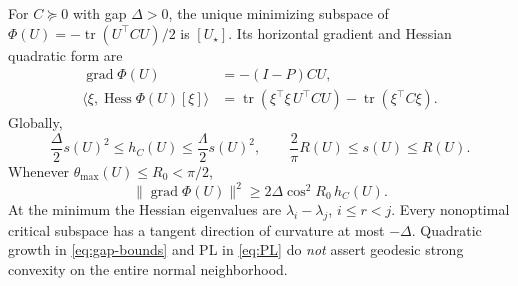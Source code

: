 \begin{theorem}
\label{thm:landscape}
For $C\succeq0$ with gap $\Delta>0$, the unique minimizing subspace of
$\Phi(U)=-\operatorname{tr}(U^\top CU)/2$ is $[U_\star]$.
Its horizontal gradient and Hessian quadratic form are
\begin{align}
 \operatorname{grad}\Phi(U)&=-(I-P)CU,\label{eq:grass-grad}\\
 \langle\xi,\operatorname{Hess}\Phi(U)[\xi]\rangle
 &=\operatorname{tr}(\xi^\top\xi\,U^\top CU)
   -\operatorname{tr}(\xi^\top C\xi).\label{eq:grass-hess}
\end{align}
Globally,
\begin{equation}
 \frac\Delta2s(U)^2\le h_C(U)\le\frac\Lambda2s(U)^2,
 \qquad \frac2\pi R(U)\le s(U)\le R(U).\label{eq:gap-bounds}
\end{equation}
Whenever $\theta_{\max}(U)\le R_0<\pi/2$,
\begin{equation}
 \|\operatorname{grad}\Phi(U)\|^2
 \ge2\Delta\cos^2 R_0\,h_C(U).\label{eq:PL}
\end{equation}
At the minimum the Hessian eigenvalues are
$\lambda_i-\lambda_j$, $i\le r<j$. Every nonoptimal critical subspace
has a tangent direction of curvature at most $-\Delta$.
Quadratic growth in \eqref{eq:gap-bounds} and PL in \eqref{eq:PL} do
\emph{not} assert geodesic strong convexity on the entire normal neighborhood.
\end{theorem}


